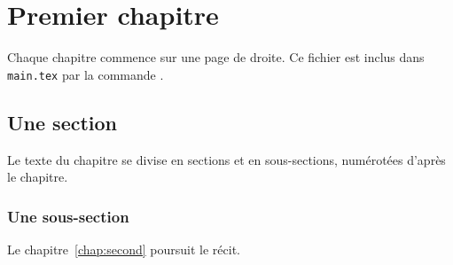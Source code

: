 \chapter{Premier chapitre}
\label{chap:premier}

Chaque chapitre commence sur une page de droite. Ce fichier est inclus dans
\texttt{main.tex} par la commande \verb||.

\section{Une section}

Le texte du chapitre se divise en sections et en sous-sections, numérotées
d'après le chapitre.

\subsection{Une sous-section}

Le chapitre~\ref{chap:second} poursuit le récit.
